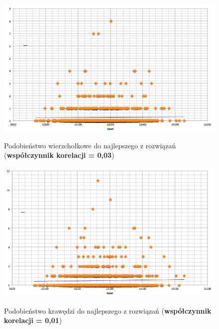 \documentclass[a4paper 10pt]{article}
\begin{document}
\begin{figure} [H]
\centering
\caption{Podobieństwo wierzchołkowe do najlepszego z rozwiązań (\textbf{współczynnik korelacji = 0,03})}
\includegraphics[angle=0,width = 1\textwidth, height=!]{images/edge_best.png}
\label{Rys. Edges}
\end{figure}

\begin{figure} [H]
\centering
\caption{Podobieństwo krawędzi do najlepszego z rozwiązań (\textbf{współczynnik korelacji = 0,01})}
\includegraphics[angle=0,width = 1\textwidth, height=!]{images/node_best.png}
\label{Rys. Edges}
\end{figure}
\end{document}
